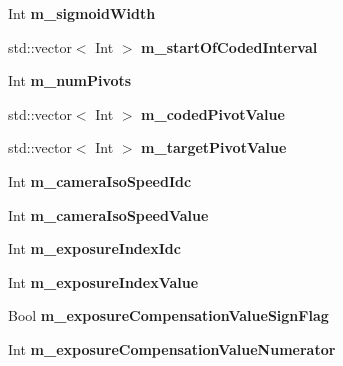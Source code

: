 \begin{DoxyCompactItemize}
Int {\bfseries m\+\_\+sigmoid\+Width}
\item 
\mbox{\label{class_s_e_i_tone_mapping_info_a8cc2efe9c6e43cc4aafbe15d463314d6}} 
std\+::vector$<$ Int $>$ {\bfseries m\+\_\+start\+Of\+Coded\+Interval}
\item 
\mbox{\label{class_s_e_i_tone_mapping_info_a85a2d1982b1bf5ebf137d5fbdbc6c596}} 
Int {\bfseries m\+\_\+num\+Pivots}
\item 
\mbox{\label{class_s_e_i_tone_mapping_info_a08d2e5ae9cd417fbc0410ce68f128c92}} 
std\+::vector$<$ Int $>$ {\bfseries m\+\_\+coded\+Pivot\+Value}
\item 
\mbox{\label{class_s_e_i_tone_mapping_info_a49bb532583f1a6469be9114de772433e}} 
std\+::vector$<$ Int $>$ {\bfseries m\+\_\+target\+Pivot\+Value}
\item 
\mbox{\label{class_s_e_i_tone_mapping_info_ae401adff83ba1a6faaaa943d6d7757c0}} 
Int {\bfseries m\+\_\+camera\+Iso\+Speed\+Idc}
\item 
\mbox{\label{class_s_e_i_tone_mapping_info_a6ee8e06cf981a306cad029764dbcea65}} 
Int {\bfseries m\+\_\+camera\+Iso\+Speed\+Value}
\item 
\mbox{\label{class_s_e_i_tone_mapping_info_a5c34fd36f812e3f13790e9d68bacc2e4}} 
Int {\bfseries m\+\_\+exposure\+Index\+Idc}
\item 
\mbox{\label{class_s_e_i_tone_mapping_info_abbbf06db8200cea5983959163f395f65}} 
Int {\bfseries m\+\_\+exposure\+Index\+Value}
\item 
\mbox{\label{class_s_e_i_tone_mapping_info_a09581d631bdc5ccc9a930f37eac9a4f5}} 
Bool {\bfseries m\+\_\+exposure\+Compensation\+Value\+Sign\+Flag}
\item 
\mbox{\label{class_s_e_i_tone_mapping_info_a53e87a7ba4b84b6faae17caf037508a4}} 
Int {\bfseries m\+\_\+exposure\+Compensation\+Value\+Numerator}

\end{DoxyCompactItemize}

